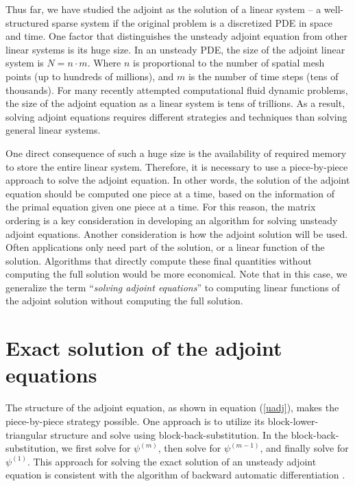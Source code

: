     Thus far, we have studied the adjoint as the solution of a linear
    system -- a well-structured sparse system if the original problem is
    a discretized PDE in space and time.  One factor that distinguishes the
    unsteady adjoint equation from other linear systems is its huge size.
    In an unsteady PDE, the size of the adjoint linear system is
    $N = n \cdot m$.  Where $n$ is proportional to the number of spatial mesh
    points (up to hundreds of millions), and $m$ is the number of time steps
    (tens of thousands).  For many recently attempted computational fluid
    dynamic problems, the size of the adjoint equation as a linear system
    is tens of trillions.
    As a result, solving adjoint equations requires different strategies
    and techniques than solving general linear systems.
    
    One direct consequence of such a huge size is the availability of
    required memory to store the entire linear system.  Therefore, it is
    necessary to use a piece-by-piece approach to solve the adjoint equation.
    In other words, the solution of the adjoint equation should be computed one
    piece at a time, based on the information of the primal equation
    given one piece at a time.  For this reason, the matrix ordering is a key
    consideration in developing an algorithm for solving unsteady adjoint
    equations.  Another consideration is how the adjoint solution will be
    used.  Often applications only need part of the solution, or a linear
    function of the solution.  Algorithms that directly compute these
    final quantities without computing the full solution would be
    more economical.  Note that in this case, we generalize the term
    ``\emph{solving adjoint equations}'' to computing linear functions of the
    adjoint solution without computing the full solution.





\section{Exact solution of the adjoint equations}
    The structure of the adjoint equation, as shown in equation
    (\ref{uadj}), makes the piece-by-piece strategy possible.  One
    approach is to utilize its block-lower-triangular structure and
    solve using block-back-substitution.  In the block-back-substitution,
    we first solve for $\psi^{(m)}$, then solve for $\psi^{(m-1)}$, and
    finally solve for $\psi^{(1)}$.  This approach for solving the exact
    solution of an unsteady adjoint equation is consistent with the
    algorithm of backward automatic differentiation \cite[]{Griewank2003}.
    
